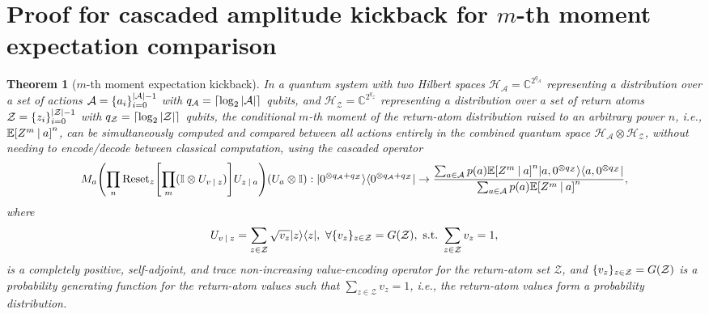 \documentclass{article}
\newtheorem{theorem}{Theorem}[section]
\DeclarePairedDelimiter{\bra}{\langle}{\rvert} %
\DeclarePairedDelimiter{\ket}{\lvert}{\rangle} %
\DeclarePairedDelimiter{\abs}{\lvert}{\rvert} %
\DeclarePairedDelimiter{\paren}{\lparen}{\rparen} %
\DeclarePairedDelimiter{\bparen}{[}{]} %
\DeclarePairedDelimiter{\set}{\{}{\}} %
\DeclarePairedDelimiter{\ceil}{\lceil}{\rceil}
\newcommand{\E}{\mathbb{E}} %
\newcommand{\hilbert}{\mathcal{H}} %
\newcommand{\pfunc}[2]{#1\paren*{#2}} %
\newcommand{\bfunc}[2]{#1\bparen*{#2}} %
\newcommand{\given}[1][]{\:#1\vert\:}
\begin{document}
\section{Proof for cascaded amplitude kickback for $m$-th moment expectation comparison}

\begin{theorem}[$m$-th moment expectation kickback]\label{thm:m_moment_expectation}
In a quantum system with two Hilbert spaces $\hilbert_{\mathcal{A}} = \mathbb{C}^{2^{q_{\mathcal{A}}}}$ representing a distribution over a set of actions $\mathcal{A} = \set{a_i}_{i=0}^{\abs{\mathcal{A}} - 1}$ with $q_{\mathcal{A}} = \ceil*{\log_{2}{\abs{\mathcal{A}}}}$ qubits, and $\hilbert_{\mathcal{Z}} = \mathbb{C}^{2^{q_{\mathcal{Z}}}}$ representing a distribution over a set of return atoms $\mathcal{Z} = \set{z_i}_{i=0}^{\abs{\mathcal{Z}} - 1}$ with $q_{\mathcal{Z}} = \ceil*{\log_{2}{\abs{\mathcal{Z}}}}$ qubits, the conditional $m$-th moment of the return-atom distribution raised to an arbitrary power $n$, i.e., $\bfunc{\mathbb{E}}{Z^{m} \given a}^{n}$, can be simultaneously computed and compared between all actions entirely in the combined quantum space $\hilbert_{\mathcal{A}} \otimes \hilbert_{\mathcal{Z}}$, without needing to encode/decode between classical computation, using the cascaded operator
% 
\begin{equation}\label{eq:def:m_moment_expectation}
M_{a} \paren*{\prod_{n} \textrm{Reset}_{z} \bparen*{\prod_{m} (\mathbb{I} \otimes U_{v \given z})} U_{z \given a}} (U_{a} \otimes \mathbb{I})
% 
: \ket{0^{\otimes q_{\mathcal{A}} + q_{\mathcal{Z}}}}\bra{0^{\otimes q_{\mathcal{A}} + q_{\mathcal{Z}}}} 
% 
\to \frac{\sum_{a \in \mathcal{A}} p(a) \bfunc{\mathbb{E}}{Z^{m} \given a}^{n} \ket{a,0^{\otimes q_{\mathcal{Z}}}}\bra{a,0^{\otimes q_{\mathcal{Z}}}}}{\sum_{a \in \mathcal{A}} p(a) \bfunc{\mathbb{E}}{Z^{m} \given a}^{n}},
\end{equation}
% 
where
% 
\begin{equation}\label{eq:def:U_v_z}
U_{v \given z} 
= \sum_{z \in \mathcal{Z}} \sqrt{v_z} \ket{z}\bra{z},
~ \forall \set{v_{z}}_{z \in \mathcal{Z}} = \pfunc{G}{\mathcal{Z}}, ~\textrm{s.t.}~ \sum_{z \in \mathcal{Z}} v_z = 1,
\end{equation}
% 
is a \emph{completely positive}, \emph{self-adjoint}, and \emph{trace non-increasing} value-encoding operator for the return-atom set $\mathcal{Z}$, and $\set{v_{z}}_{z \in \mathcal{Z}} = \pfunc{G}{\mathcal{Z}}$ is a probability generating function for the return-atom values such that $\sum_{z \in \mathcal{Z}} v_z = 1$, i.e., the return-atom values form a probability distribution.
\end{theorem}
\end{document}

